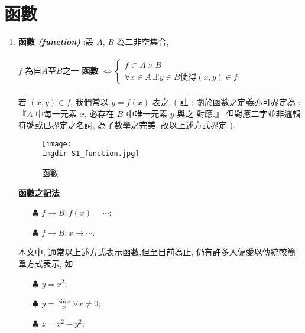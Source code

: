 	\section{函數 {}}
	\begin{enumerate}
		\item {\textbf{函數   \emph{ (function) }}:設 $A$, $B$ 為二非空集合,\\
		\\
		$f$ 為自$A$至$B$之一 \textbf {函數} 
		$ \Leftrightarrow 				
			\left\{
			\begin{array}{l}			
				f \subset A \times B \\ 
          		\forall x \in A \, \exists ! y \in B \mbox{使得} (x,y) \in f
			\end{array}		
			\right.
		$\\
		\\
		若 $(x, y) \in f$, 我們常以 $y = f(x)$ 表之.
		( 註 : 關於函數之定義亦可界定為 : 『$A$ 中每一元素 $x$, 必存在 $B$ 中唯一元素 $y$ 與之			對應.』 但對應二字並非邏輯符號或已界定之名詞, 為了數學之完美, 故以上述方式界定 ).	
		\begin{figure}[H]	
		 	 \centering	 			 	 
   			 \texttt{[image: \\imgdir S1\_function.jpg]} 
   			 \caption{函數}   		
   			 \label{set:function}   			 		 
		 \end{figure}
		\underline{\textbf{函數之記法}}		
		\begin{itemize}
			\item[$\clubsuit$] $ f \rightarrow B : f(x) = \cdots ; $
			\item[$\clubsuit$] $ f \rightarrow B : x \rightarrow \cdots . $
		\end{itemize}					
		本文中, 通常以上述方式表示函數,但至目前為止, 仍有許多人偏愛以傳統較簡單方式表示, 如
		\begin{itemize}
			\item[$\clubsuit$] $ y=x^2 ;$
			\item[$\clubsuit$] $ y=\frac{\sin x}{x} \, \forall x \neq 0 ; $
			\item[$\clubsuit$] $ z=x^2-y^2 ;$
		\end{itemize}
		}
		

\end{enumerate}
